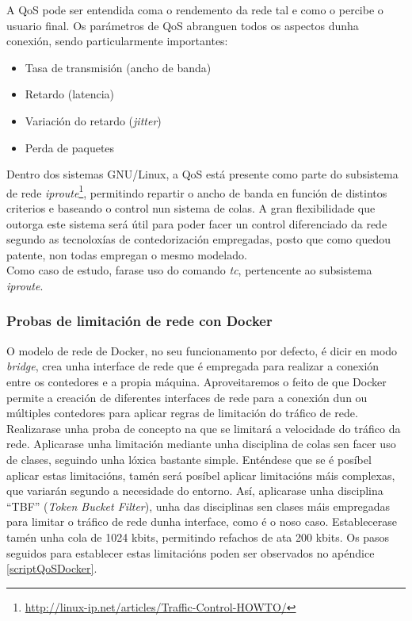 A \gls{QoS} pode ser entendida coma o rendemento da rede tal e como o percibe o usuario final. Os parámetros de \gls{QoS} abranguen todos os aspectos dunha conexión, sendo particularmente importantes:

\begin{itemize}
\item Tasa de transmisión (ancho de banda)
\item Retardo (latencia)
\item Variación do retardo (\textit{jitter})
\item Perda de paquetes
\end{itemize}

Dentro dos sistemas GNU/Linux, a QoS está presente como parte do subsistema de rede \textit{iproute}\footnote{\url{http://linux-ip.net/articles/Traffic-Control-HOWTO/}}, permitindo repartir o ancho de banda en función de distintos criterios e baseando o control nun sistema de colas. A gran flexibilidade que outorga este sistema será útil para poder facer un control diferenciado da rede segundo as tecnoloxías de contedorización empregadas, posto que como quedou patente, non todas empregan o mesmo modelado.\\

Como caso de estudo, farase uso do comando {\it tc}, pertencente ao subsistema \textit{iproute}.

\subsubsection{Probas de limitación de rede con Docker}

O modelo de rede de Docker, no seu funcionamento por defecto, é dicir en modo \textit{bridge}, crea unha interface de rede que é empregada para realizar a conexión entre os contedores e a propia máquina. Aproveitaremos o feito de que Docker permite a creación de diferentes interfaces de rede para a conexión dun ou múltiples contedores para aplicar regras de limitación do tráfico de rede.\\

Realizarase unha proba de concepto na que se limitará a velocidade do tráfico da rede. Aplicarase unha limitación mediante unha disciplina de colas sen facer uso de clases, seguindo unha lóxica bastante simple. Enténdese que se é posíbel aplicar estas limitacións, tamén será posíbel aplicar limitacións máis complexas, que variarán segundo a necesidade do entorno. Así, aplicarase unha disciplina ``TBF'' (\textit{Token Bucket Filter}), unha das disciplinas sen clases máis empregadas para limitar o tráfico de rede dunha interface, como é o noso caso. Establecerase tamén unha cola de 1024 kbits, permitindo refachos de ata 200 kbits. Os pasos seguidos para establecer estas limitacións poden ser observados no apéndice \ref{scriptQoSDocker}.\\

